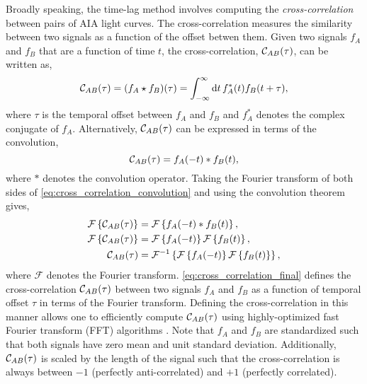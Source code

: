 Broadly speaking, the time-lag method involves computing the \textit{cross-correlation} between pairs of AIA light curves. The cross-correlation measures the similarity between two signals as a function of the offset betwen them. Given two signals $f_A$ and $f_B$ that are a function of time $t$, the cross-correlation, $\mathcal{C}_{AB}(\tau)$, can be written as,
\begin{equation}
    \mathcal{C}_{AB}(\tau) = (f_A\star f_B)(\tau) = \int_{-\infty}^\infty\textup{d}t\,f_A^{\ast}(t)f_B(t + \tau),
\end{equation}
where $\tau$ is the temporal offset between $f_A$ and $f_B$ and $f_A^{\ast}$ denotes the complex conjugate of $f_A$. Alternatively, $\mathcal{C}_{AB}(\tau)$ can be expressed in terms of the convolution,
\begin{equation}\label{eq:cross_correlation_convolution}
    \mathcal{C}_{AB}(\tau) = f_A(-t) \ast f_B(t),
\end{equation}
where $\ast$ denotes the convolution operator. Taking the Fourier transform of both sides of \autoref{eq:cross_correlation_convolution} and using the convolution theorem \citep[section 20.4]{arfken_mathematical_2013} gives,
\begin{align}\label{eq:cross_correlation_final}
    \mathcal{F}\left\{\mathcal{C}_{AB}(\tau)\right\} &= \mathcal{F}\left\{f_A(-t) \ast f_B(t)\right\}, \nonumber \\
    \mathcal{F}\left\{\mathcal{C}_{AB}(\tau)\right\} &= \mathcal{F}\left\{f_A(-t)\right\}\mathcal{F}\left\{f_B(t)\right\}, \nonumber \\
    \mathcal{C}_{AB}(\tau) &= \mathcal{F}^{-1}\left\{\mathcal{F}\left\{f_A(-t)\right\}\mathcal{F}\left\{f_B(t)\right\}\right\},
\end{align}
where $\mathcal{F}$ denotes the Fourier transform. \autoref{eq:cross_correlation_final} defines the cross-correlation $\mathcal{C}_{AB}(\tau)$ between two signals $f_A$ and $f_B$ as a function of temporal offset $\tau$ in terms of the Fourier transform. Defining the cross-correlation in this manner allows one to efficiently compute $\mathcal{C}_{AB}(\tau)$ using highly-optimized fast Fourier transform (FFT) algorithms \citep[e.g. the widely-used FFT algorithm developed by][]{cooley_algorithm_1965}. Note that $f_A$ and $f_B$ are standardized such that both signals have zero mean and unit standard deviation. Additionally, $\mathcal{C}_{AB}(\tau)$ is scaled by the length of the signal such that the cross-correlation is always between $-1$ (perfectly anti-correlated) and $+1$ (perfectly correlated).

